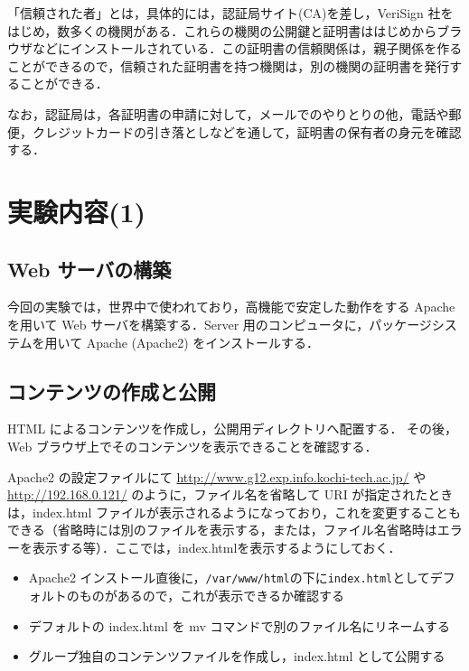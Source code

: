 「信頼された者」とは，具体的には，認証局サイト(CA)を差し，VeriSign 社を
はじめ，数多くの機関がある．これらの機関の公開鍵と証明書ははじめからブラ
ウザなどにインストールされている．この証明書の信頼関係は，親子関係を作る
ことができるので，信頼された証明書を持つ機関は，別の機関の証明書を発行す
ることができる．

なお，認証局は，各証明書の申請に対して，メールでのやりとりの他，電話や郵
便，クレジットカードの引き落としなどを通して，証明書の保有者の身元を確認
する．

\section{実験内容(1)}

\subsection*{Web サーバの構築}

今回の実験では，世界中で使われており，高機能で安定した動作をする Apache 
を用いて Web サーバを構築する．Server 用のコンピュータに，パッケージシス
テムを用いて Apache (Apache2) をインストールする．

\subsection*{コンテンツの作成と公開}

HTML によるコンテンツを作成し，公開用ディレクトリへ配置する．
その後，Web ブラウザ上でそのコンテンツを表示できることを確認する．

Apache2 の設定ファイルにて \url{http://www.g12.exp.info.kochi-tech.ac.jp/} や \url{http://192.168.0.121/} のように，ファイル名を省略して URI が指定されたときは，index.html ファイルが表示されるようになっており，これを変更することもできる（省略時には別のファイルを表示する，または，ファイル名省略時はエラーを表示する等）．ここでは，index.htmlを表示するようにしておく．

\begin{itemize}
 \item Apache2 インストール直後に，\texttt{/var/www/html}の下に\texttt{index.html}としてデフォルトのものがあるので，これが表示できるか確認する
 \item デフォルトの index.html を mv コマンドで別のファイル名にリネームする
 \item グループ独自のコンテンツファイルを作成し，index.html として公開する
\end{itemize}


